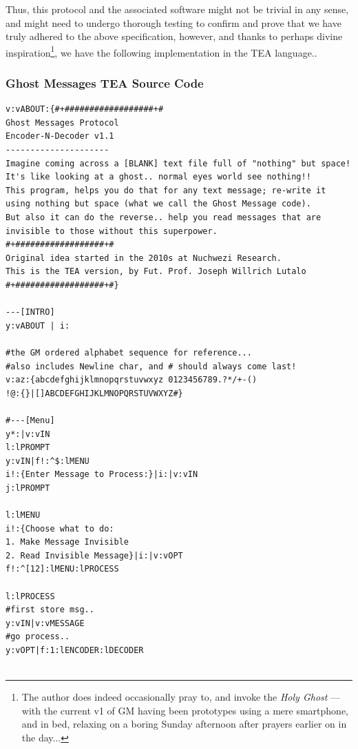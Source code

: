 \documentclass[a4paper, 18pt]{book} %
\begin{document}
{{{\vspace{2em}

Thus, this protocol and the associated software might not be trivial in any sense, and might need to undergo thorough testing to confirm and prove that we have truly adhered to the above specification, however, and thanks to perhaps divine inspiration\footnote{The author does indeed occasionally pray to, and invoke the \textit{Holy Ghost} --- with the current v1 of GM having been prototypes using a mere smartphone, and in bed, relaxing on a boring Sunday afternoon after prayers earlier on in the day...}, we have the following implementation in the TEA language..


\subsubsection{Ghost Messages TEA Source Code}


\vspace{2em}
{
 \Large
  \begin{tcolorbox}[teaterminalstyle, title=TEA Program:  GHOST Messages Protocol v1.1, breakable]
  \begin{lstlisting}[language=TEA,breaklines=true,]    
v:vABOUT:{#+##################+#
Ghost Messages Protocol
Encoder-N-Decoder v1.1
---------------------
Imagine coming across a [BLANK] text file full of "nothing" but space!
It's like looking at a ghost.. normal eyes world see nothing!! 
This program, helps you do that for any text message; re-write it 
using nothing but space (what we call the Ghost Message code). 
But also it can do the reverse.. help you read messages that are invisible to those without this superpower.
#+##################+#
Original idea started in the 2010s at Nuchwezi Research.
This is the TEA version, by Fut. Prof. Joseph Willrich Lutalo
#+##################+#}

---[INTRO]
y:vABOUT | i:

#the GM ordered alphabet sequence for reference...
#also includes Newline char, and # should always come last!
v:az:{abcdefghijklmnopqrstuvwxyz 0123456789.?*/+-()
!@:{}|[]ABCDEFGHIJKLMNOPQRSTUVWXYZ#} 

#---[Menu]
y*:|v:vIN
l:lPROMPT
y:vIN|f!:^$:lMENU 
i!:{Enter Message to Process:}|i:|v:vIN
j:lPROMPT

l:lMENU
i!:{Choose what to do:
1. Make Message Invisible
2. Read Invisible Message}|i:|v:vOPT
f!:^[12]:lMENU:lPROCESS

l:lPROCESS
#first store msg..
y:vIN|v:vMESSAGE 
#go process..
y:vOPT|f:1:lENCODER:lDECODER


\end{lstlisting}
\end{tcolorbox}}}}}
\end{document}
